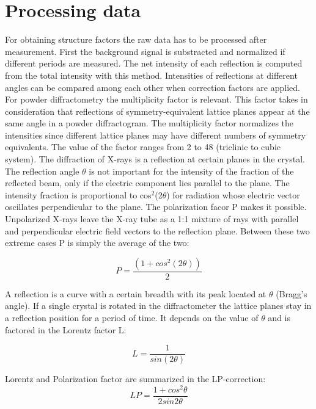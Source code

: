 \section{Processing data}
For obtaining structure factors the raw data has to be processed after measurement. First the background signal is substracted and normalized if different periods are measured. The net intensity of each reflection is computed from the total intensity with this method. Intensities of reflections at different angles can be compared among each other when correction factors are applied. For powder diffractometry the multiplicity factor is relevant. This factor takes in consideration  that reflections of symmetry-equivalent lattice planes appear at the same angle in a powder diffractogram. The multiplicity factor normalizes the intensities since different lattice planes may have different numbers of symmetry equivalents. The value of the factor  ranges from 2 to 48 (triclinic to cubic system). The diffraction of X-rays is a reflection at certain planes in the crystal. The reflection angle $\theta$ is not important for the intensity of the fraction of the reflected beam, only if the electric component lies parallel to the plane. The intensity fraction is proportional to cos$^2$(2$\theta$) for radiation whose electric vector oscillates perpendicular to the plane. The polarization facor P makes it possible. Unpolarized X-rays leave the X-ray tube as a 1:1 mixture of rays with parallel and perpendicular electric field vectors to the reflection plane. Between these two extreme cases P is simply the average of the two:

\begin{equation}
P = \frac{(1 + cos^2(2\theta))}{2}
\end{equation}

A reflection is a curve with a certain breadth with its peak located at $\theta$ (Bragg's  angle). If a single crystal is rotated in the diffractometer the lattice planes stay in a reflection position for a period of time. It depends on the value of $\theta$ and is factored in the Lorentz factor L:

\begin{equation}
L = \frac{1}{sin(2\theta)}
\end{equation}

Lorentz and Polarization factor are summarized in the LP-correction:
\begin{equation}
LP=\frac{1+cos^2\theta}{2sin 2 \theta}
\end{equation}

